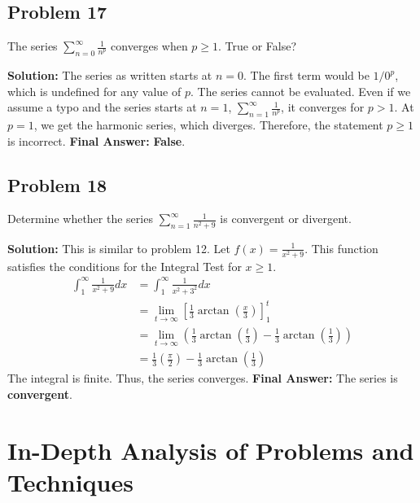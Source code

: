 \documentclass{article}
\begin{document}
\subsection*{Problem 17}
The series $\sum_{n=0}^{\infty} \frac{1}{n^p}$ converges when $p \ge 1$. True or False?

\textbf{Solution:}
The series as written starts at $n=0$. The first term would be $1/0^p$, which is undefined for any value of $p$. The series cannot be evaluated.
Even if we assume a typo and the series starts at $n=1$, $\sum_{n=1}^{\infty} \frac{1}{n^p}$, it converges for $p>1$. At $p=1$, we get the harmonic series, which diverges. Therefore, the statement $p \ge 1$ is incorrect.
\textbf{Final Answer:} \textbf{False}.

\subsection*{Problem 18}
Determine whether the series $\sum_{n=1}^{\infty} \frac{1}{n^2+9}$ is convergent or divergent.

\textbf{Solution:}
This is similar to problem 12. Let $f(x) = \frac{1}{x^2+9}$. This function satisfies the conditions for the Integral Test for $x \ge 1$.
\begin{align*}
    \int_1^\infty \frac{1}{x^2+9} dx &= \int_1^\infty \frac{1}{x^2+3^2} dx \\
    &= \lim_{t \to \infty} \left[ \frac{1}{3}\arctan\left(\frac{x}{3}\right) \right]_1^t \\
    &= \lim_{t \to \infty} \left( \frac{1}{3}\arctan\left(\frac{t}{3}\right) - \frac{1}{3}\arctan\left(\frac{1}{3}\right) \right) \\
    &= \frac{1}{3} \left( \frac{\pi}{2} \right) - \frac{1}{3}\arctan\left(\frac{1}{3}\right)
\end{align*}
The integral is finite. Thus, the series converges.
\textbf{Final Answer:} The series is \textbf{convergent}.

\section{In-Depth Analysis of Problems and Techniques}
\end{document}
